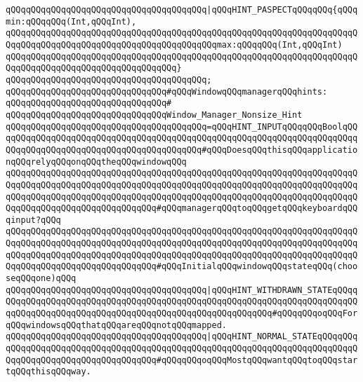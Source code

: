 \verb|qQQqqQQqqQQqqQQqqQQqqQQqqQQqqQQqqQQqqQQq|\verb#|qQQqHINT_PASPECTqQQqqQQq{qQQqmin:qQQqqQQq(Int,qQQqInt),#\newline
\verb|qQQqqQQqqQQqqQQqqQQqqQQqqQQqqQQqqQQqqQQqqQQqqQQqqQQqqQQqqQQqqQQqqQQqqQQqqQQqqQQqqQQqqQQqqQQqqQQqqQQqqQQqqQQqqQQqmax:qQQqqQQq(Int,qQQqInt)|\newline
\verb|qQQqqQQqqQQqqQQqqQQqqQQqqQQqqQQqqQQqqQQqqQQqqQQqqQQqqQQqqQQqqQQqqQQqqQQqqQQqqQQqqQQqqQQqqQQqqQQqqQQqqQQq}|\newline
\verb|qQQqqQQqqQQqqQQqqQQqqQQqqQQqqQQqqQQqqQQq;|\newline
\newline
\verb|qQQqqQQqqQQqqQQqqQQqqQQqqQQqqQQq#qQQqWindowqQQqmanagerqQQqhints:|\newline
\verb|qQQqqQQqqQQqqQQqqQQqqQQqqQQqqQQq#|\newline
\verb|qQQqqQQqqQQqqQQqqQQqqQQqqQQqqQQqWindow_Manager_Nonsize_Hint|\newline
\verb|qQQqqQQqqQQqqQQqqQQqqQQqqQQqqQQqqQQqqQQq=qQQqHINT_INPUTqQQqqQQqBoolqQQqqQQqqQQqqQQqqQQqqQQqqQQqqQQqqQQqqQQqqQQqqQQqqQQqqQQqqQQqqQQqqQQqqQQqqQQqqQQqqQQqqQQqqQQqqQQqqQQqqQQqqQQqqQQq#qQQqDoesqQQqthisqQQqapplicationqQQqrelyqQQqonqQQqtheqQQqwindowqQQq|\newline
\verb|qQQqqQQqqQQqqQQqqQQqqQQqqQQqqQQqqQQqqQQqqQQqqQQqqQQqqQQqqQQqqQQqqQQqqQQqqQQqqQQqqQQqqQQqqQQqqQQqqQQqqQQqqQQqqQQqqQQqqQQqqQQqqQQqqQQqqQQqqQQqqQQqqQQqqQQqqQQqqQQqqQQqqQQqqQQqqQQqqQQqqQQqqQQqqQQqqQQqqQQqqQQqqQQqqQQqqQQqqQQqqQQqqQQqqQQqqQQqqQQq#qQQqmanagerqQQqtoqQQqgetqQQqkeyboardqQQqinput?qQQq|\newline
\newline
\verb|qQQqqQQqqQQqqQQqqQQqqQQqqQQqqQQqqQQqqQQqqQQqqQQqqQQqqQQqqQQqqQQqqQQqqQQqqQQqqQQqqQQqqQQqqQQqqQQqqQQqqQQqqQQqqQQqqQQqqQQqqQQqqQQqqQQqqQQqqQQqqQQqqQQqqQQqqQQqqQQqqQQqqQQqqQQqqQQqqQQqqQQqqQQqqQQqqQQqqQQqqQQqqQQqqQQqqQQqqQQqqQQqqQQqqQQqqQQqqQQq#qQQqInitialqQQqwindowqQQqstateqQQq(chooseqQQqone)qQQq|\newline
\verb|qQQqqQQqqQQqqQQqqQQqqQQqqQQqqQQqqQQqqQQq|\verb#|qQQqHINT_WITHDRAWN_STATEqQQqqQQqqQQqqQQqqQQqqQQqqQQqqQQqqQQqqQQqqQQqqQQqqQQqqQQqqQQqqQQqqQQqqQQqqQQqqQQqqQQqqQQqqQQqqQQqqQQqqQQqqQQqqQQqqQQqqQQqqQQqqQQq#\verb|#qQQqqQQqoqQQqForqQQqwindowsqQQqthatqQQqareqQQqnotqQQqmapped.|\newline
\verb|qQQqqQQqqQQqqQQqqQQqqQQqqQQqqQQqqQQqqQQq|\verb#|qQQqHINT_NORMAL_STATEqQQqqQQqqQQqqQQqqQQqqQQqqQQqqQQqqQQqqQQqqQQqqQQqqQQqqQQqqQQqqQQqqQQqqQQqqQQqqQQqqQQqqQQqqQQqqQQqqQQqqQQqqQQq#\verb|#qQQqqQQqoqQQqMostqQQqwantqQQqtoqQQqstartqQQqthisqQQqway.|\newline
